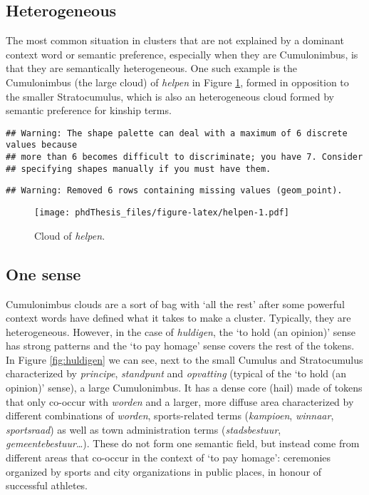 \documentclass[
]{book}
\begin{document}
\hypertarget{heterogeneous-2}{%
\subsection{Heterogeneous}\label{heterogeneous-2}}

The most common situation in clusters that are not explained by a dominant context word or semantic preference, especially when they are Cumulonimbus, is that they are semantically heterogeneous. One such example is the Cumulonimbus (the large cloud) of \emph{helpen} in Figure \ref{fig:helpen}, formed in opposition to the smaller Stratocumulus, which is also an heterogeneous cloud formed by semantic preference for kinship terms.



\begin{verbatim}
## Warning: The shape palette can deal with a maximum of 6 discrete values because
## more than 6 becomes difficult to discriminate; you have 7. Consider
## specifying shapes manually if you must have them.
\end{verbatim}

\begin{verbatim}
## Warning: Removed 6 rows containing missing values (geom_point).
\end{verbatim}

\begin{figure}
\centering
\texttt{[image: phdThesis\_files/figure-latex/helpen-1.pdf]}
\caption{\label{fig:helpen}Cloud of \emph{helpen}.}
\end{figure}

\hypertarget{one-sense-3}{%
\subsection{One sense}\label{one-sense-3}}

Cumulonimbus clouds are a sort of bag with `all the rest' after some powerful context words have defined what it takes to make a cluster. Typically, they are heterogeneous. However, in the case of \emph{huldigen}, the `to hold (an opinion)' sense has strong patterns and the `to pay homage' sense covers the rest of the tokens. In Figure \ref{fig:huldigen} we can see, next to the small Cumulus and Stratocumulus characterized by \emph{principe}, \emph{standpunt} and \emph{opvatting} (typical of the `to hold (an opinion)' sense), a large Cumulonimbus. It has a dense core (hail) made of tokens that only co-occur with \emph{worden} and a larger, more diffuse area characterized by different combinations of \emph{worden}, sports-related terms (\emph{kampioen}, \emph{winnaar}, \emph{sportsraad}) as well as town administration terms (\emph{stadsbestuur}, \emph{gemeentebestuur}\ldots). These do not form one semantic field, but instead come from different areas that co-occur in the context of `to pay homage': ceremonies organized by sports and city organizations in public places, in honour of successful athletes.
\end{document}
